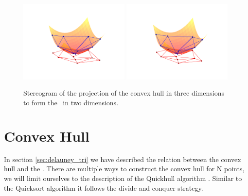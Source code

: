 \begin{figure}[tb] %
   \centering
   \includegraphics[width=0.49\textwidth]{chapter_ndinterp/plots/delauney_project_left.pdf} 
   \hspace{-1.5cm}
   \includegraphics[width=0.49\textwidth]{chapter_ndinterp/plots/delauney_project_right.pdf} 
   \caption[Stereogram of the projection of the convex hull in three dimensions]{Stereogram \citep[produced using a method described in ][]{Vogt11} of the projection of the convex hull in three dimensions to form the \deltri\ in two dimensions.}
   \label{fig:delauney_projection}
\end{figure}

\section{Convex Hull}
In section \ref{sec:delauney_tri} we have described the relation between the convex hull  and the \deltri. There are multiple ways to construct the convex hull for N points, we will limit ourselves to the description of the Quickhull algorithm \citep{Barber96thequickhull}. Similar to the Quicksort algorithm it follows the divide and conquer strategy. 


